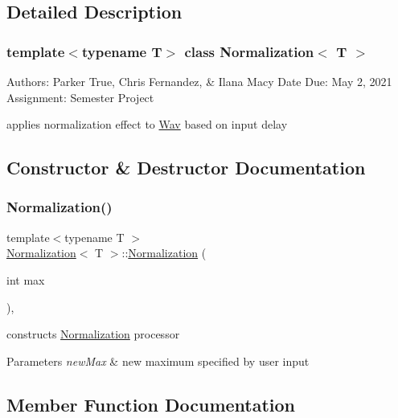 \subsection{Detailed Description}
\subsubsection*{template$<$typename T$>$\newline
class Normalization$<$ T $>$}

Authors\+: Parker True, Chris Fernandez, \& Ilana Macy Date Due\+: May 2, 2021 Assignment\+: Semester Project

applies normalization effect to \hyperlink{classWav}{Wav} based on input delay 

\subsection{Constructor \& Destructor Documentation}
\mbox{\label{classNormalization_a70f7d23e000cbdd8c0067a981b44ebe9}} 
\subsubsection{\texorpdfstring{Normalization()}{Normalization()}}
{\footnotesize\ttfamily template$<$typename T $>$ \\
\hyperlink{classNormalization}{Normalization}$<$ T $>$\+::\hyperlink{classNormalization}{Normalization} (\begin{DoxyParamCaption}\item[{int}]{max }\end{DoxyParamCaption})\hspace{0.3cm}{\ttfamily [inline]}, {\ttfamily [explicit]}}

constructs \hyperlink{classNormalization}{Normalization} processor 
\begin{DoxyParams}{Parameters}
{\em new\+Max} & new maximum specified by user input \\
\hline
\end{DoxyParams}


\subsection{Member Function Documentation}
\mbox{\label{classNormalization_a0ca4f15e6f0d23ec77c2946583e248b6}} 

